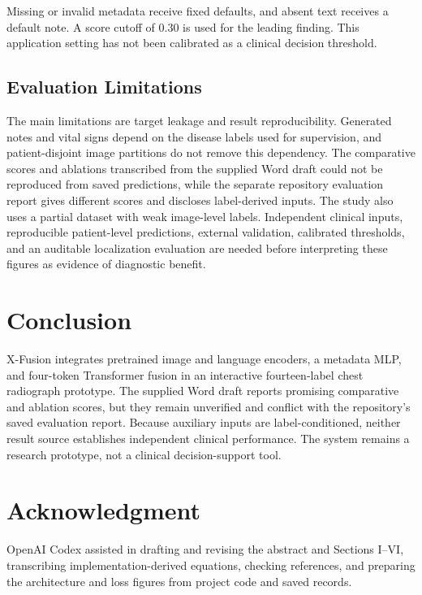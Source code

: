 \documentclass[conference,letterpaper]{IEEEtran}
\begin{document}
Missing or invalid metadata receive fixed defaults, and absent text receives a default note. A score cutoff of 0.30 is used for the leading finding. This application setting has not been calibrated as a clinical decision threshold.

\subsection{Evaluation Limitations}\label{sec:limitations}

The main limitations are target leakage and result reproducibility. Generated notes and vital signs depend on the disease labels used for supervision, and patient-disjoint image partitions do not remove this dependency. The comparative scores and ablations transcribed from the supplied Word draft could not be reproduced from saved predictions, while the separate repository evaluation report gives different scores and discloses label-derived inputs. The study also uses a partial dataset with weak image-level labels. Independent clinical inputs, reproducible patient-level predictions, external validation, calibrated thresholds, and an auditable localization evaluation are needed before interpreting these figures as evidence of diagnostic benefit.


\section{Conclusion}

X-Fusion integrates pretrained image and language encoders, a metadata MLP, and four-token Transformer fusion in an interactive fourteen-label chest radiograph prototype. The supplied Word draft reports promising comparative and ablation scores, but they remain unverified and conflict with the repository's saved evaluation report. Because auxiliary inputs are label-conditioned, neither result source establishes independent clinical performance. The system remains a research prototype, not a clinical decision-support tool.

\section*{Acknowledgment}

OpenAI Codex assisted in drafting and revising the abstract and Sections I--VI, transcribing implementation-derived equations, checking references, and preparing the architecture and loss figures from project code and saved records.
\end{document}

